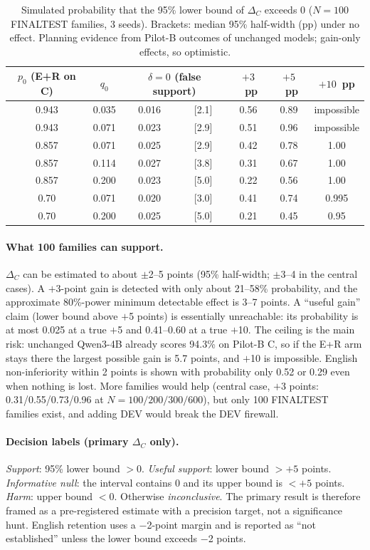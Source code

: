 \documentclass[12pt,a4paper,oneside]{report}
\renewcommand{\_}{\oldunderscore\allowbreak}
\begin{document}
\begin{table}[t]
\centering\small
\caption{Simulated probability that the 95\% lower bound of $\Delta_C$ exceeds 0 ($N = 100$ FINAL\_TEST families, 3 seeds). Brackets: median 95\% half-width (pp) under no effect. Planning evidence from Pilot-B outcomes of unchanged models; gain-only effects, so optimistic.}
\label{tab:power}
\begin{tabular}{@{}ccccccc@{}}
\toprule
$p_0$ (E+R on C) & $q_0$ & \multicolumn{2}{c}{$\delta = 0$ (false support)} & $+3$~pp & $+5$~pp & $+10$~pp\\
\midrule
0.943 & 0.035 & 0.016 & [2.1] & 0.56 & 0.89 & impossible\\
0.943 & 0.071 & 0.023 & [2.9] & 0.51 & 0.96 & impossible\\
0.857 & 0.071 & 0.025 & [2.9] & 0.42 & 0.78 & 1.00\\
0.857 & 0.114 & 0.027 & [3.8] & 0.31 & 0.67 & 1.00\\
0.857 & 0.200 & 0.023 & [5.0] & 0.22 & 0.56 & 1.00\\
0.70 & 0.071 & 0.020 & [3.0] & 0.41 & 0.74 & 0.995\\
0.70 & 0.200 & 0.025 & [5.0] & 0.21 & 0.45 & 0.95\\
\bottomrule
\end{tabular}
\end{table}

\paragraph{What 100 families can support.} $\Delta_C$ can be estimated to about $\pm$2--5 points (95\% half-width; $\pm$3--4 in the central cases). A $+$3-point gain is detected with only about 21--58\% probability, and the approximate 80\%-power minimum detectable effect is 3--7 points. A ``useful gain'' claim (lower bound above $+$5 points) is essentially unreachable: its probability is at most 0.025 at a true $+$5 and 0.41--0.60 at a true $+$10. The ceiling is the main risk: unchanged Qwen3-4B already scores 94.3\% on Pilot-B C, so if the E+R arm stays there the largest possible gain is 5.7 points, and $+$10 is impossible. English non-inferiority within 2 points is shown with probability only 0.52 or 0.29 even when nothing is lost. More families would help (central case, $+$3 points: 0.31/0.55/0.73/0.96 at $N = 100/200/300/600$), but only 100 FINAL\_TEST families exist, and adding DEV would break the DEV firewall.

\paragraph{Decision labels (primary $\Delta_C$ only).} \emph{Support}: 95\% lower bound $>0$. \emph{Useful support}: lower bound $>+5$ points. \emph{Informative null}: the interval contains 0 and its upper bound is $<+5$ points. \emph{Harm}: upper bound $<0$. Otherwise \emph{inconclusive}. The primary result is therefore framed as a pre-registered estimate with a precision target, not a significance hunt. English retention uses a $-$2-point margin and is reported as ``not established'' unless the lower bound exceeds $-$2 points.
\end{document}
